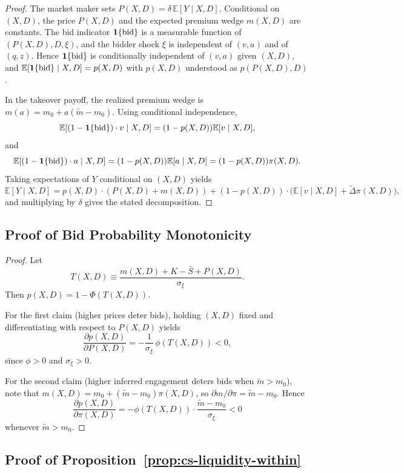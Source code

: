 \documentclass[11pt]{article}
\newcommand{\E}{\mathbb{E}}
\newcommand{\1}{\mathbf{1}}
\begin{document}
\begin{proof}
    The market maker sets $P(X,D)=\delta\,\E[Y \mid X,D]$. Conditional on $(X,D)$, the price $P(X,D)$ and the expected premium wedge $m(X,D)$ are constants. The bid indicator $\1\{\textup{bid}\}$ is a measurable function of $(P(X,D),D,\xi)$, and the bidder shock $\xi$ is independent of $(v,a)$ and of $(q,z)$. Hence $\1\{\textup{bid}\}$ is conditionally independent of $(v,a)$ given $(X,D)$, and $\E[\1\{\textup{bid}\} \mid X,D]=p(X,D)$ with $p(X,D)$ understood as $p(P(X,D),D)$.

  In the takeover payoff, the realized premium wedge is $m(a)=m_0+a(\tilde{m}-m_0)$. Using conditional independence,
\[
\E[(1-\1\{\textup{bid}\})\cdot v \mid X,D] = (1-p(X,D))\E[v \mid X,D],
\]
and
\[
\E[(1-\1\{\textup{bid}\})\cdot a \mid X,D] = (1-p(X,D))\E[a \mid X,D] = (1-p(X,D))\pi(X,D).
\]
  Taking expectations of $Y$ conditional on $(X,D)$ yields
  \[
  \E[Y \mid X,D]
  =p(X,D)\cdot(P(X,D)+m(X,D))+(1-p(X,D))\cdot\big(\E[v \mid X,D]+\tilde{\Delta}\pi(X,D)\big),
  \]
  and multiplying by $\delta$ gives the stated decomposition.
\end{proof}

\subsection{Proof of Bid Probability Monotonicity}
\label{app:proof-bid-monotone}

\begin{proof}
Let
\[
T(X,D)\equiv \frac{m(X,D)+K-\bar{S}+P(X,D)}{\sigma_\xi}.
\]
Then $p(X,D)=1-\Phi(T(X,D))$.

  For the first claim (higher prices deter bids), holding $(X,D)$ fixed and differentiating with respect to $P(X,D)$ yields
  \[
  \frac{\partial p(X,D)}{\partial P(X,D)}=-\frac{1}{\sigma_\xi}\,\phi(T(X,D))<0,
  \]
  since $\phi>0$ and $\sigma_\xi>0$.
  
  For the second claim (higher inferred engagement deters bids when $\tilde m>m_0$), note that $m(X,D)=m_0+(\tilde{m}-m_0)\pi(X,D)$, so $\partial m/\partial \pi=\tilde{m}-m_0$. Hence
  \[
  \frac{\partial p(X,D)}{\partial \pi(X,D)}=-\phi(T(X,D))\cdot \frac{\tilde{m}-m_0}{\sigma_\xi}<0
  \]
  whenever $\tilde{m}>m_0$.
\end{proof}

\subsection{Proof of Proposition~\ref{prop:cs-liquidity-within}}
\label{app:proof-cs-liquidity-within}
\end{document}
